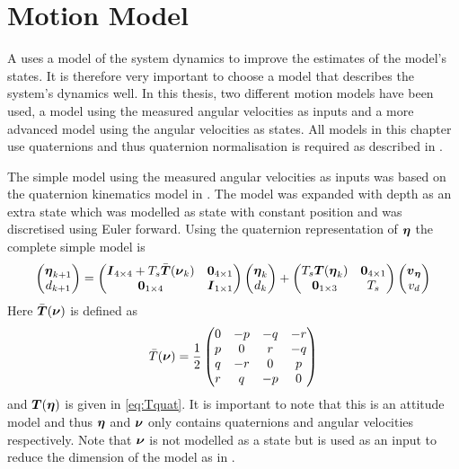 \section{Motion Model}\label{sec:motion_model}
A \abbrKF uses a model of the system dynamics to improve the estimates of the model's states. It is therefore very important to choose a model that describes the system's dynamics well. In this thesis, two different motion models have been used, a model using the measured angular velocities as inputs and a more advanced model using the angular velocities as states. All models in this chapter use quaternions and thus quaternion normalisation is required as described in .

The simple model using the measured angular velocities as inputs was based on the quaternion kinematics model in \citet[p. 47]{Tornqvist}. The model was expanded with depth as an extra state which was modelled as state with constant position and was discretised using Euler forward. Using the quaternion representation of $\boldsymbol{\eta}$ the complete simple model is 
\begin{equation}
\begin{pmatrix}
\boldsymbol{\eta}_{k+1}\\
d_{k+1}
\end{pmatrix} 
=
 \begin{pmatrix}
 \boldsymbol{I}_{4\times4} + T_s \bar{\boldsymbol{T}}(\boldsymbol{\nu}_k) & \boldsymbol{0}_{4\times1}\\
 \boldsymbol{0}_{1\times4} & \boldsymbol{I}_{1\times1} 
 \end{pmatrix}
 \begin{pmatrix}
 \boldsymbol{\eta}_{k}\\
 d_k
 \end{pmatrix}
 +
  \begin{pmatrix}
  T_s \boldsymbol{T}(\boldsymbol{\eta}_{k}) & \boldsymbol{0}_{4\times1}\\
  \boldsymbol{0}_{1\times3} & T_s
  \end{pmatrix}
  \begin{pmatrix}
  \boldsymbol{v}_{\boldsymbol{\eta}}\\
  v_d 
  \end{pmatrix}
\end{equation}
Here $\bar{\boldsymbol{T}}(\boldsymbol{\nu})$ is defined as
\begin{equation}
\bar{T}(\boldsymbol{\nu}) = \frac{1}{2}
\begin{pmatrix}
     0 &-p &-q &-r\\
     p & 0 & r &-q\\
     q &-r & 0 & p\\
     r & q &-p & 0
\end{pmatrix}
\end{equation} and $\boldsymbol{T}(\boldsymbol{\eta})$ is given in \eqref{eq:Tquat}.
It is important to note that this is an attitude model and thus $\boldsymbol{\eta}$ and $\boldsymbol{\nu}$ only contains quaternions and angular velocities respectively. Note that $\boldsymbol{\nu}$ is not modelled as a state but is used as an input to reduce the dimension of the model as in \citet{Tornqvist}. 

